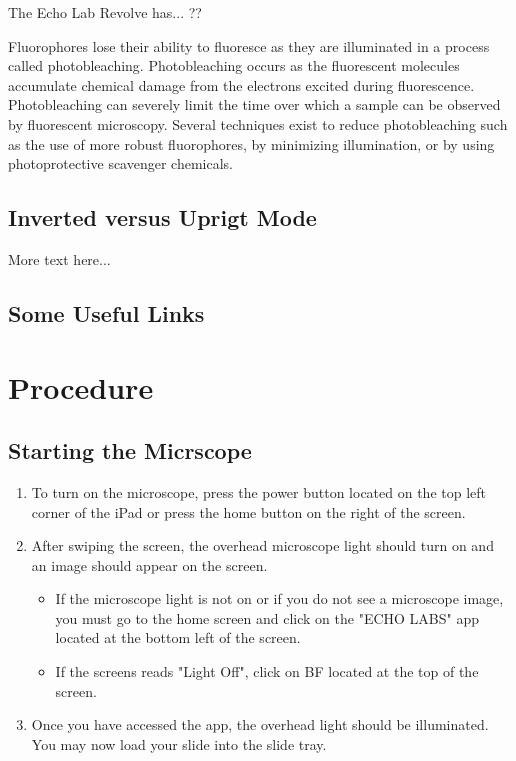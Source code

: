 \documentclass{article}
\begin{document}
The Echo Lab Revolve has... ??

Fluorophores lose their ability to fluoresce as they are illuminated in a process called photobleaching. Photobleaching occurs as the fluorescent molecules accumulate chemical damage from the electrons excited during fluorescence. Photobleaching can severely limit the time over which a sample can be observed by fluorescent microscopy. Several techniques exist to reduce photobleaching such as the use of more robust fluorophores, by minimizing illumination, or by using photoprotective scavenger chemicals.

\subsection{Inverted versus Uprigt Mode}

More text here...

\subsection{Some Useful Links}


\section{Procedure}

\subsection{Starting the Micrscope}

\begin{enumerate}
  \item To turn on the microscope, press the power button located on the top left corner of the iPad or press the home button on the right of the screen.
  \item After swiping the screen, the overhead microscope light should turn on and an image should appear on the screen.
  
\begin{itemize}
  \item If the microscope light is not on or if you do not see a microscope image, you must go to the home screen and click on the "ECHO LABS" app located at the bottom left of the screen.
  \item If the screens reads "Light Off", click on BF located at the top of the screen.
\end{itemize}

  \item Once you have accessed the app, the overhead light should be illuminated. You may now load your slide into the slide tray.
\end{enumerate} 
  
\end{document}
